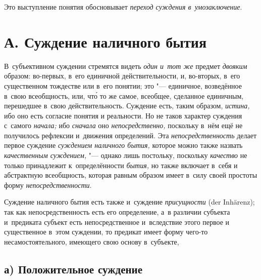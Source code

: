Это выступление понятия обосновывает {\em переход суждения в~умозаключение}.

\section[А. Суждение наличного бытия]{А. Суждение наличного бытия}

В~субъективном суждении стремятся видеть {\em один и~тот же} предмет
{\em двояким} образом: во-первых, в~его единичной действительности, и,
во-вторых, в~его существенном тождестве или в~его понятии; это
"--- единичное, возведённое в~свою всеобщность, или, чт\'{о} то же
самое, всеобщее, сделанное единичным, перешедшее в~свою действительность.
Суждение есть, таким образом, {\em истина,} ибо оно есть согласие понятия и
реальности. Но не таков характер суждения с~самого {\em начала;} ибо
{\em сначала} оно {\em непосредственно,} поскольку в~нём ещё не получилось
рефлексии и~движения определений. Эта {\em непосредственность} делает первое
суждение {\em суждением наличного бытия,} которое можно также назвать {\em
качественным суждением,} "--- однако лишь постольку, поскольку {\em качество}
не только принадлежит к~определённости {\em бытия,} но также включает в~себя и
абстрактную всеобщность, которая равным образом имеет в~силу своей простоты
форму {\em непосредственности}.

Суждение наличного бытия есть также и~суждение {\em присущности} (der
Inhärenz); так как непосредственность есть его определение, а~в различии
субъекта и~предиката субъект есть непосредственное и~вследствие этого первое и
существенное в~этом суждении, то предикат имеет форму чего-то
несамостоятельного, имеющего свою основу в~субъекте,

\subsection[а) Положительное суждение ]{а) Положительное суждение}

